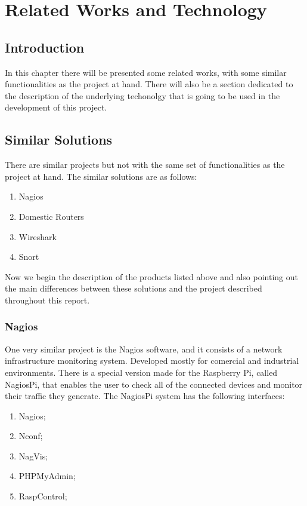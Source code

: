 \chapter{Related Works and Technology}
\label{chap:related-material}

\section{Introduction}
\label{chap2:sec:intro}
In this chapter there will be presented some related works, with some similar
functionalities as the project at hand. There will also be a section dedicated
to the description of the underlying techonolgy that is going to be used in the
development of this project.

\section{Similar Solutions}
\label{chap2:sec:similar-sol}
There are similar projects but not with the same set of functionalities as the
project at hand. The similar solutions are as follows:
\begin{enumerate}
	\item Nagios
	\item Domestic Routers
	\item Wireshark
	\item Snort
\end{enumerate}

Now we begin the description of the products listed above and also pointing out
the main differences between these solutions and the project described
throughout this report.

\subsection{Nagios}
\label{chap2:sec:similar-sol:sub:nagios}
One very similar project is the Nagios software, and it consists of a network
infrastructure monitoring system. Developed mostly for comercial and industrial
environments. There is a special version made for the Raspberry Pi, called
NagiosPi, that enables the user to check all of the connected devices and
monitor their traffic they generate. The NagiosPi system has the following
interfaces:
\begin{enumerate}
	\item Nagios;
	\item Nconf;
	\item NagVis;
	\item PHPMyAdmin;
	\item RaspControl;
\end{enumerate}

